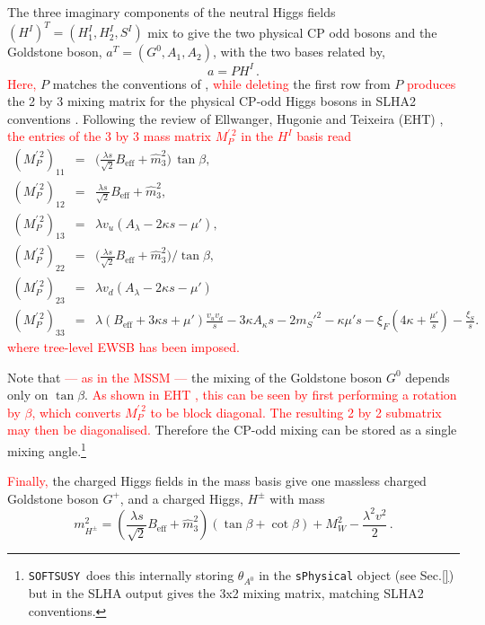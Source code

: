 \documentclass[final,3p,times,pdflatex]{elsarticle}
\def\SOFTSUSY{{\tt SOFTSUSY}\ }
\newcommand{\be}{\begin{equation}}
\newcommand{\ee}{\end{equation}}
\newcommand{\ba}{\begin{eqnarray}}
\newcommand{\ea}{\end{eqnarray}}
\newcommand{\ds}{\displaystyle}
\newcommand*{\red}[1]{\textcolor{red}{#1}}
\begin{document}
The three imaginary components of the neutral Higgs fields $(H^I)^T = (H^I_1, H_2^I, S^I)$ mix to give the two physical CP odd bosons and the Goldstone boson, $a^T = (G^0, A_1, A_2)$, with the two bases related by,
 \be 
a = P H^I\,. \ee 
\red{Here,} %
$P$ matches the conventions of \cite{Degrassi:2009yq}, \red{while deleting} %
 the first row from $P$ \red{produces} %
 the 2 by 3 mixing matrix for the physical CP-odd Higgs bosons in SLHA2 conventions \cite{Allanach:2008qq}. Following the review of Ellwanger, Hugonie and Teixeira (EHT) \cite{Ellwanger:2009dp}, \red{the entries of the 3 by 3 mass matrix $ M^{\prime \, 2}_{P}$ in the $H^I$ basis read} %
\ba
( M^{\prime \, 2}_{P})_{11} & = & \Bigg(\ds\frac{\lambda s}{\sqrt{2}} B_\textrm{eff} +
\widehat{m}_3^2\Bigg)\,\tan\beta , \\
( M^{\prime \, 2}_{P})_{12} & = & \ds\frac{\lambda s}{\sqrt{2}} B_\textrm{eff} +
\widehat{m}_3^2, \\
( M^{\prime \, 2}_{P})_{13} & = & \lambda v_u (A_\lambda - 2\kappa s - \mu'), \\
( M^{\prime \, 2}_{P})_{22} & = & \Bigg(\ds\frac{\lambda s}{\sqrt{2}} B_\textrm{eff} +
\widehat{m}_3^2\Bigg)/\tan\beta ,  \\
( M^{\prime \, 2}_{P})_{23} & = & \lambda v_d (A_\lambda - 2\kappa s - \mu')\\
( M^{\prime \, 2}_{P})_{33} & = & \lambda (B_\textrm{eff}+3\kappa s +\mu')\ds\frac{v_u
v_d}{s} -3\kappa A_\kappa s  -2 m_{S}'^2 -\kappa \mu' s 
-\xi_F\left(4\kappa + \frac{\mu'}{s}\right) -\ds\frac{\xi_S}{s}.
\label{eq:MA0}
\ea
\red{where tree-level EWSB has been imposed.} %

Note that \red{--- as in the MSSM ---} the mixing of the Goldstone boson $G^0$ depends only on $\tan\beta$. \red{As shown in EHT \cite{Ellwanger:2009dp}, this can be seen by first performing a rotation by $\beta$, which converts $M^{\prime\, 2}_P$ to be block diagonal.  The resulting 2 by 2 submatrix may then be diagonalised.} %
  Therefore the CP-odd mixing can be stored as a single mixing angle.\footnote{\SOFTSUSY does this internally storing $\theta_{A^0}$ in the {\tt sPhysical} object (see Sec.\ref{}) but in the SLHA output gives the 3x2 mixing matrix, matching SLHA2 conventions.}


\red{Finally,} %
 the charged Higgs fields in the mass basis give one massless charged Goldstone boson $G^+$, and a charged Higgs, $H^\pm$ with mass
\be m_{H^\pm}^2 = \left(\ds\frac{\lambda s}{\sqrt{2}} B_\textrm{eff} +
\widehat{m}_3^2\right)(\tan \beta + \cot \beta) + M_W^2 - \ds\frac{\lambda^2 v^2}{2}\,. \ee
  
\end{document}
